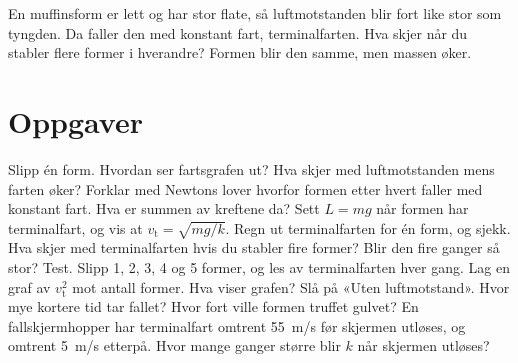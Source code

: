 \documentclass[11pt]{article}
\begin{document}

En muffinsform er lett og har stor flate, så luftmotstanden blir fort like stor som tyngden. Da faller den med konstant fart, terminalfarten. Hva skjer når du stabler flere former i hverandre? Formen blir den samme, men massen øker.

\section*{Oppgaver}

\begin{oppgaveliste}
\oppgave {}Slipp én form. Hvordan ser fartsgrafen ut? Hva skjer med luftmotstanden mens farten øker?
\svar
\oppgave {}Forklar med Newtons lover hvorfor formen etter hvert faller med konstant fart. Hva er summen av kreftene da?
\svar
\oppgave {}Sett $L = mg$ når formen har terminalfart, og vis at $v_{\mathrm{t}} = \sqrt{mg/k}$. Regn ut terminalfarten for én form, og sjekk.
\svar
\oppgave {}Hva skjer med terminalfarten hvis du stabler fire former? Blir den fire ganger så stor? Test.
\svar
\oppgave {}Slipp 1, 2, 3, 4 og 5 former, og les av terminalfarten hver gang. Lag en graf av $v_{\mathrm{t}}^{2}$ mot antall former. Hva viser grafen?
\svar
\oppgave {}Slå på «Uten luftmotstand». Hvor mye kortere tid tar fallet? Hvor fort ville formen truffet gulvet?
\svar
\oppgave {}En fallskjermhopper har terminalfart omtrent 55~m/s før skjermen utløses, og omtrent 5~m/s etterpå. Hvor mange ganger større blir $k$ når skjermen utløses?
\svar
\end{oppgaveliste}
\end{document}
